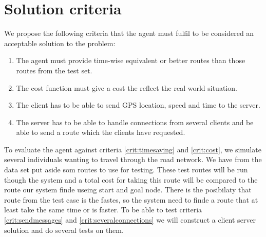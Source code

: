 \section{Solution criteria}
We propose the following criteria that the agent must fulfil to be considered an acceptable solution to the problem:

\begin{enumerate}
\item The agent must provide time-wise equivalent or better routes than those routes from the test set.\label{crit:timesaving}
\item The cost function must give a cost the reflect the real world situation.\label{crit:cost}
\item The client has to be able to send GPS location, speed and time to the server.\label{crit:sendmessages}
\item The server has to be able to handle connections from several clients and be able to send a route which the clients have requested.\label{crit:severalconnections}
\end{enumerate}

To evaluate the agent against criteria \ref{crit:timesaving} and \ref{crit:cost}, we simulate several individuals wanting to travel through the road network. We have from the data set put aside som routes to use for testing. These test routes will be run though the system and a total cost for taking this route will be compared to the route our system finde useing start and goal node. There is the posibilaty that route from the test case is the fastes, so the system need to finde a route that at least take the same time or is faster.
To be able to test criteria \ref{crit:sendmessages} and \ref{crit:severalconnections} we will construct a client server solution and do several tests on them. 

